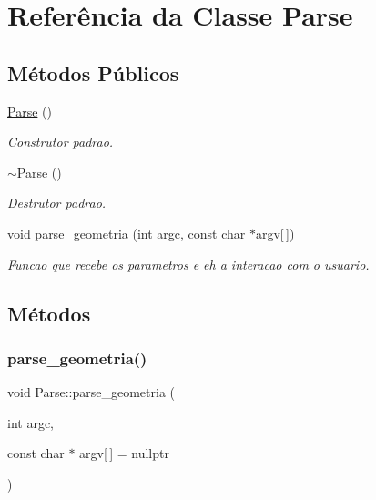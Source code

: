\hypertarget{classParse}{}\section{Referência da Classe Parse}
\label{classParse}
\subsection*{Métodos Públicos}
\begin{DoxyCompactItemize}
\item 
\mbox{\label{classParse_ab44bf754dbe7e6fc008af31af8ca75fb}} 
\hyperlink{classParse_ab44bf754dbe7e6fc008af31af8ca75fb}{Parse} ()
\begin{DoxyCompactList}\small\item\em Construtor padrao. \end{DoxyCompactList}\item 
\mbox{\label{classParse_a09620677a05691231960c07803aec495}} 
\hyperlink{classParse_a09620677a05691231960c07803aec495}{$\sim$\+Parse} ()
\begin{DoxyCompactList}\small\item\em Destrutor padrao. \end{DoxyCompactList}\item 
void \hyperlink{classParse_a620949e81a084e31bce2f789fa875130}{parse\+\_\+geometria} (int argc, const char $\ast$argv\mbox{[}$\,$\mbox{]})
\begin{DoxyCompactList}\small\item\em Funcao que recebe os parametros e eh a interacao com o usuario. \end{DoxyCompactList}\end{DoxyCompactItemize}


\subsection{Métodos}
\mbox{\label{classParse_a620949e81a084e31bce2f789fa875130}} 
\subsubsection{\texorpdfstring{parse\+\_\+geometria()}{parse\_geometria()}}
{\footnotesize\ttfamily void Parse\+::parse\+\_\+geometria (\begin{DoxyParamCaption}\item[{int}]{argc,  }\item[{const char $\ast$}]{argv\mbox{[}$\,$\mbox{]} = {\ttfamily nullptr} }\end{DoxyParamCaption})}



